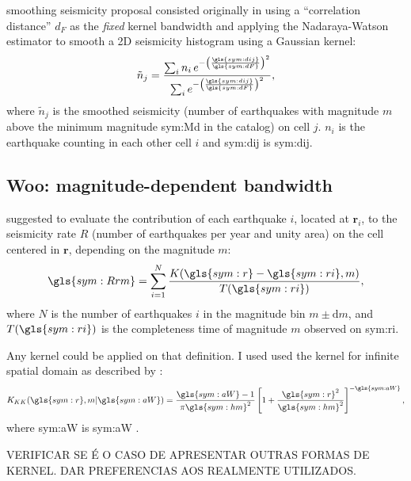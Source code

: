 \documentclass[draft, grl]{agutex}
\begin{document}
\begin{article}
\citet{frankel_1995} smoothing seismicity proposal consisted originally in using a ``correlation distance'' $d_F$ as the \textit{fixed} kernel bandwidth and applying the Nadaraya-Watson \citep{nadaraya_1964, watson_1964} estimator to smooth a 2D seismicity histogram using a Gaussian kernel:
\begin{equation}
	\ensuremath{
		\tilde{n}_j = \frac{ \sum_{i} n_i \,e^{ - \left(\frac{\gls{sym:dij}}{\gls{sym:dF}}\right)^2}}
						   { \sum_{i}     e^{ - \left(\frac{\gls{sym:dij}}{\gls{sym:dF}}\right)^2}},
	}
	\label{eq:ni}
\end{equation}
where $\tilde{n}_j$ is the smoothed seismicity (number of earthquakes with magnitude $m$ above the minimum magnitude \gls{sym:Md} in the catalog) on cell $j$. $n_i$ is the earthquake counting in each other cell $i$ and \gls{sym:dij} is \glsdesc{sym:dij}.



\subsection{Woo: magnitude-dependent bandwidth}

\citet{woo_1996} suggested to evaluate the contribution of each earthquake $i$, located at $\boldsymbol{r}_i$, to the seismicity rate $R$ (number of earthquakes per year and unity area) on the cell centered in $\boldsymbol{r}$, depending on the magnitude $m$:
\begin{equation}
	\ensuremath{
		\gls{sym:Rrm} = \sum_{i=1}^{N} \frac{ K(\gls{sym:r} - \gls{sym:ri}, m)}
											{T({\gls{sym:ri})}},
	}
	\label{eq:Rrm}
\end{equation}
where $N$ is the number of earthquakes $i$ in the magnitude bin $m \pm \mathrm{d}m$,
and $T(\gls{sym:ri})$ is the completeness time of magnitude $m$ observed on \gls{sym:ri}.


Any kernel could be applied on that definition. I used used the \citet{kagan_knopoff_1980} kernel for infinite spatial domain as described by \citet{woo_1996}:
\begin{equation}
	\ensuremath{
		K_{KK}(\gls{sym:r}, m \arrowvert \gls{sym:aW}) =  \frac{  \gls{sym:aW}  -1}{\pi\gls{sym:hm}^2}
							\left[ 1 + \frac{\gls{sym:r}^2}{\gls{sym:hm}^2} \right]^{-\gls{sym:aW}},
	}
	\label{eq:k_kj}
\end{equation}
where \gls{sym:aW} is \glsdesc{sym:aW} \citep{verejones_1992}.


VERIFICAR SE É O CASO DE APRESENTAR OUTRAS FORMAS DE KERNEL. DAR PREFERENCIAS AOS REALMENTE UTILIZADOS.



\end{article}
\end{document}
